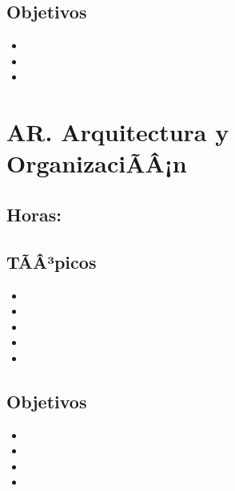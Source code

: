 \subsection*{Objetivos}
\begin{itemize}
	\item \ALONCEObjUNO
	\item \ALONCEObjDOS
	\item \ALONCEObjTRES
\end{itemize}

\section{AR. Arquitectura y OrganizaciÃÂ¡n}\label{sec:BOK-AR}

\subsection{\ARUNODef}\label{sec:BOK-AR1}
\subsection*{Horas: \ARUNOHours}

\subsection*{TÃÂ³picos}
\begin{itemize}
	\item \ARUNOTopicVista
	\item \ARUNOTopicBloques
	\item \ARUNOTopicExpresiones
	\item \ARUNOTopicNotacion
	\item \ARUNOTopicConsideraciones
\end{itemize}

\subsection*{Objetivos}
\begin{itemize}
	\item \ARUNOObjUNO
	\item \ARUNOObjDOS
	\item \ARUNOObjTRES
	\item \ARUNOObjCUATRO
\end{itemize}

\subsection{\ARDOSDef}\label{sec:BOK-AR2}

